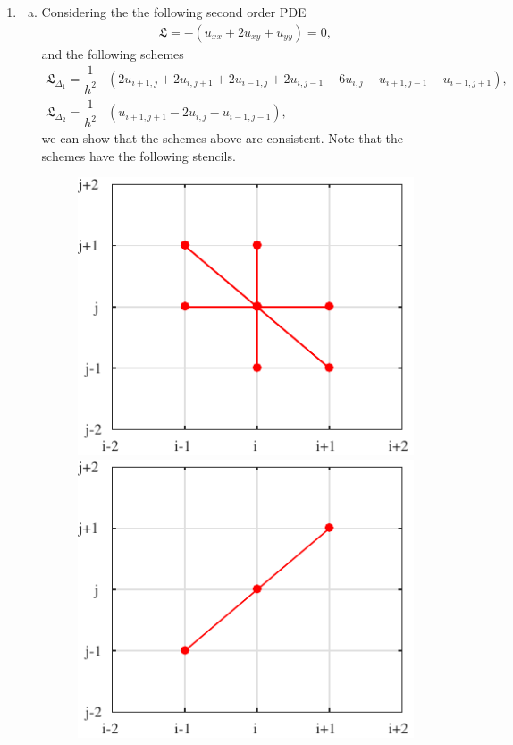 \documentclass[10pt,a4paper,twoside, french]{article}
\numberwithin{equation}{section}
\numberwithin{figure}{section}
\numberwithin{table}{section}
\begin{document}
\begin{enumerate}
\newpage


\item \begin{enumerate}[a.]
\item Considering the the following second order PDE
\begin{align}
\mathfrak{L} = -(u_{xx}+2u_{xy}+u_{yy})=0,
\label{eq:task3_pde}
\end{align}
and the following schemes
\begin{align}
\mathfrak{L}_{\Delta_1}=\dfrac{1}{h^2}&(2u_{i+1,j}+2u_{i,j+1}+2u_{i-1,j}+2u_{i,j-1}-6u_{i,j}-u_{i+1,j-1}-u_{i-1,j+1}),\\
\mathfrak{L}_{\Delta_2}=\dfrac{1}{h^2}&(u_{i+1,j+1}-2u_{i,j}-u_{i-1,j-1}),
\end{align}
we can show that the schemes above are consistent. Note that the schemes have the following stencils.
\begin{figure}[h]
\centering
\includegraphics[scale=.8]{fig/scheme1}
\hspace{.8cm}
\includegraphics[scale=.8]{fig/scheme2}

\end{figure}
\end{enumerate}
\end{enumerate}
\end{document}

